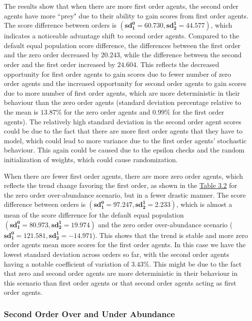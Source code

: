 The results show that when there are more first order agents, the second order agents have more ``prey" due to their ability to gain scores from first order agents. The score difference between orders is $(\mathbf{sd^0_1 = 60.730}, \mathbf{sd^1_2 = 44.577})$, which indicates a noticeable advantage shift to second order agents. Compared to the default equal population score difference, the differences between the first order and the zero order decreased by $\mathbf{20.243}$, while the difference between the second order and the first order increased by $\mathbf{24.604}$. This reflects the decreased opportunity for first order agents to gain scores due to fewer number of zero order agents and the increased opportunity for second order agents to gain scores due to more number of first order agents, which are more deterministic in their behaviour than the zero order agents (standard deviation percentage relative to the mean is $\mathbf{13.87\%}$ for the zero order agents and $\mathbf{0.99\%}$ for the first order agents). The relatively high standard deviation in the second order agent scores could be due to the fact that there are more first order agents that they have to model, which could lead to more variance due to the first order agents' stochastic behaviour. This again could be caused due to the epsilon checks and the random initialization of weights, which could cause randomization.

When there are fewer first order agents, there are more zero order agents, which reflects the trend change favoring the first order, as shown in the \hyperref[table:non-sig-zero-order-simple]{Table 3.2} for the zero order over-abundance scenario, but in a fewer drastic manner. The score difference between orders is $(\mathbf{sd^0_1 = 97.247}, \mathbf{sd^1_2 = 2.233})$, which is almost a mean of the score difference for the default equal population $(\mathbf{sd^0_1 = 80.973}, \mathbf{sd^1_2 = 19.974})$ and the zero order over-abundance scenario ($\mathbf{sd^0_1 = 121.581}, \mathbf{sd^1_2 = -14.971}$). This shows that the trend is stable and more zero order agents mean more scores for the first order agents. In this case we have the lowest standard deviation across orders so far, with the second order agents having a notable coefficient of variation of $\mathbf{3.43\%}$. This might be due to the fact that zero and second order agents are more deterministic in their behaviour in this scenario than first order agents or that second order agents acting as first order agents.


\subsubsection{Second Order Over and Under Abundance}

